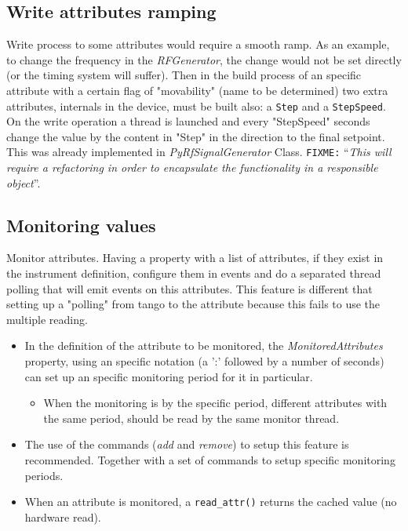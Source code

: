 \documentclass[a4paper,10pt]{article}
\newcommand{\fixme}[1]{\texttt{\color{red}FIXME:} ``\emph{#1}''}
\begin{document}
\subsection{Write attributes ramping}\label{sec:ramping}

Write process to some attributes would require a smooth ramp. As an example, to change the frequency in the \emph{RFGenerator}, the change would not be set directly (or the timing system will suffer). Then in the build process of an specific attribute with a certain flag of "movability" (name to be determined) two extra attributes, internals in the device, must be built also: a \texttt{Step} and a \texttt{StepSpeed}. On the write operation a thread is launched and every "StepSpeed" seconds change the value by the content in "Step" in the direction to the final setpoint. This was already implemented in \emph{PyRfSignalGenerator} Class. \fixme{This will require a refactoring in order to encapsulate the functionality in a \emph{responsible object}}.

\subsection{Monitoring values}\label{sec:monitor}

Monitor attributes. Having a property with a list of attributes, if they exist in the instrument definition, configure them in events and do a separated thread polling that will emit events on this attributes. This feature is different that setting up a "polling" from tango to the attribute because this fails to use the multiple reading.

\begin{itemize}
    \item In the definition of the attribute to be monitored, the \emph{MonitoredAttributes} property, using an specific notation (a ':' followed by a number of seconds) can set up an specific monitoring period for it in particular.
    \begin{itemize}
	\item When the monitoring is by the specific period, different attributes with the same period, should be read by the same monitor thread.
    \end{itemize}
    \item The use of the commands (\emph{add} and \emph{remove}) to setup this feature is recommended. Together with a set of commands to setup specific monitoring periods.
    \item When an attribute is monitored, a {\tt read\_attr()} returns the cached value (no hardware read).
\end{itemize}
\end{document}
